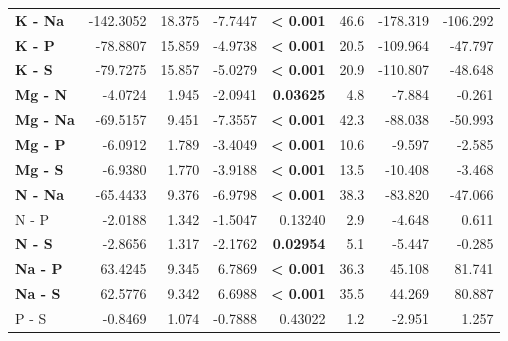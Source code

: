 \begin{table}[H]
\begin{tabular}[t]{>{}lrrr>{}rrrr}
\textbf{K - Na} & -142.3052 & 18.375 & -7.7447 & \textbf{< 0.001} & 46.6 & -178.319 & -106.292\\
\textbf{K - P} & -78.8807 & 15.859 & -4.9738 & \textbf{< 0.001} & 20.5 & -109.964 & -47.797\\
\textbf{K - S} & -79.7275 & 15.857 & -5.0279 & \textbf{< 0.001} & 20.9 & -110.807 & -48.648\\
\textbf{Mg - N} & -4.0724 & 1.945 & -2.0941 & \textbf{0.03625} & 4.8 & -7.884 & -0.261\\
\textbf{Mg - Na} & -69.5157 & 9.451 & -7.3557 & \textbf{< 0.001} & 42.3 & -88.038 & -50.993\\
\textbf{Mg - P} & -6.0912 & 1.789 & -3.4049 & \textbf{< 0.001} & 10.6 & -9.597 & -2.585\\
\textbf{Mg - S} & -6.9380 & 1.770 & -3.9188 & \textbf{< 0.001} & 13.5 & -10.408 & -3.468\\
\textbf{N - Na} & -65.4433 & 9.376 & -6.9798 & \textbf{< 0.001} & 38.3 & -83.820 & -47.066\\
N - P & -2.0188 & 1.342 & -1.5047 & 0.13240 & 2.9 & -4.648 & 0.611\\
\textbf{N - S} & -2.8656 & 1.317 & -2.1762 & \textbf{0.02954} & 5.1 & -5.447 & -0.285\\
\textbf{Na - P} & 63.4245 & 9.345 & 6.7869 & \textbf{< 0.001} & 36.3 & 45.108 & 81.741\\
\textbf{Na - S} & 62.5776 & 9.342 & 6.6988 & \textbf{< 0.001} & 35.5 & 44.269 & 80.887\\
P - S & -0.8469 & 1.074 & -0.7888 & 0.43022 & 1.2 & -2.951 & 1.257\\
\bottomrule
\end{tabular}
\end{table}
